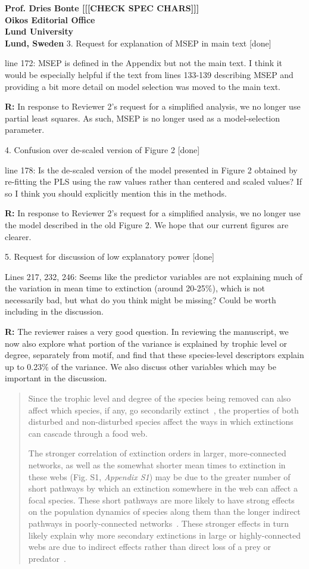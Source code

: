 \documentclass[12pt]{letter}
\begin{document}
\begin{letter}{\bf Prof. Dries Bonte [[[CHECK SPEC CHARS]]]\\
Oikos Editorial Office \\
Lund University \\
Lund, Sweden}
    3. Request for explanation of MSEP in main text [done]

        line 172: MSEP is defined in the Appendix but not the main text. I think it would be especially helpful if the text from lines 133-139 describing MSEP and providing a bit more detail on model selection was moved to the main text.
        
        \textbf{R:} In response to Reviewer 2's request for a simplified analysis, we no longer use partial least squares. As such, MSEP is no longer used as a model-selection parameter.


  4. Confusion over de-scaled version of Figure 2 [done]

    line 178: Is the de-scaled version of the model presented in Figure 2 obtained by re-fitting the PLS using the raw values rather than centered and scaled values? If so I think you should explicitly mention this in the methods.   


    \textbf{R:} In response to Reviewer 2's request for a simplified analysis, we no longer use the model described in the old Figure 2. We hope that our current figures are clearer.


  5. Request for discussion of low explanatory power [done]

    Lines 217, 232, 246: Seems like the predictor variables are not explaining much of the variation in mean time to extinction (around 20-25\%), which is not necessarily bad, but what do you think might be missing? Could be worth including in the discussion.

    \textbf{R:}
    The reviewer raises a very good question. In reviewing the manuscript, we now also explore what portion of the variance is explained by trophic level or degree, separately from motif, and find that these species-level descriptors explain up to 0.23\% of the variance. We also discuss other variables which may be important in the discussion.
    
    \begin{quotation}
        Since the trophic level and degree of the species being removed can also affect which species, if any, go secondarily extinct~\citep{Wootton2016a,Dunne2002}, the properties of both disturbed and non-disturbed species affect the ways in which extinctions can cascade through a food web.
        
        The stronger correlation of extinction orders in larger, more-connected networks, as well as the somewhat shorter mean times to extinction in these webs (Fig. S1, \emph{Appendix S1}) may be due to the greater number of short pathways by which an extinction somewhere in the web can affect a focal species. 
		These short pathways are more likely to have strong effects on the population dynamics of species along them than the longer indirect pathways in poorly-connected networks~\citep{Jordan2002,Jordan2006}.
		These stronger effects in turn likely explain why more secondary extinctions in large or highly-connected webs are due to indirect effects rather than direct loss of a prey or predator~\citep{Wootton2016a}. 


\end{quotation}
\end{letter}
\end{document}
